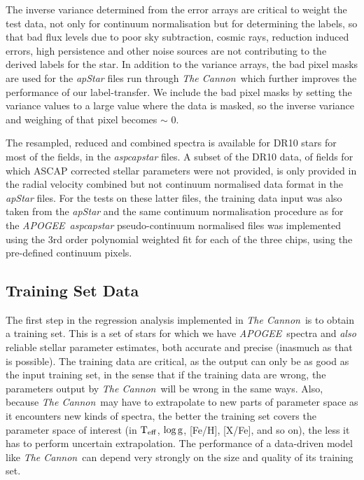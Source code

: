 \documentclass[12pt, preprint]{aastex}
\newcommand{\teff}{\mbox{$\rm T_{eff}$}}
\newcommand{\logg}{\mbox{$\rm \log g$}}
\newcommand{\tc}{\textsl{The Cannon}}
\newcommand{\apogee}{\textsl{APOGEE}}
\begin{document}
The inverse variance determined from the error arrays are critical to weight the test data, not only for continuum normalisation but for determining the labels, so that bad flux levels due to poor sky subtraction, cosmic rays, reduction induced errors, high persistence and other noise sources are not contributing to the derived labels for the star. In addition to the variance arrays, the bad pixel masks are used for the \textit{apStar} files run through \tc\, which further improves the performance of our label-transfer. We include the bad pixel masks by setting the variance values to a large value where the data is masked, so the inverse variance and weighing of that pixel becomes $\sim$ 0. 

The resampled, reduced and combined spectra is available for DR10 stars for most of the fields, in the \textit{aspcapstar} files. A subset of the DR10 data, of fields for which ASCAP corrected stellar parameters were not provided, is only provided in the radial velocity combined but not continuum normalised data format in the \textit{apStar} files. For the tests on these latter files, the training data input was also taken from the \textit{apStar} and the same continuum normalisation procedure as for the \apogee\ \textit{aspcapstar} pseudo-continuum normalised files was implemented using the 3rd order polynomial weighted fit for each of the three chips, using the pre-defined continuum pixels.


\subsection{Training Set Data}

The first step in the regression analysis implemented in \tc\ is to
obtain a training set. This is a set of stars for which we have \apogee\ spectra and
\emph{also} reliable stellar parameter estimates, both accurate and
precise (inasmuch as that is possible).
The training data are critical, as the output can only be as good as
the input training set, in the sense that if the training data are
wrong, the parameters output by \tc\ will be wrong in the same ways.
Also, because \tc\ may have to extrapolate to new parts of parameter
space as it encounters new kinds of spectra, the better the training
set covers the parameter space of interest (in \teff, \logg, [Fe/H],
[X/Fe], and so on), the less it has to perform uncertain
extrapolation.
The performance of a data-driven model like \tc\ can depend very
strongly on the size and quality of its training set.
\end{document}
